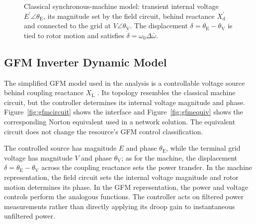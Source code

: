 \documentclass[11pt]{article}
\begin{document}
\begin{figure}[tbp]\centering

\caption{Classical synchronous-machine model: transient internal voltage $E^\prime\angle\theta_{\mathrm{E}}$, its magnitude set by the field circuit, behind reactance $X^\prime_{\mathrm{d}}$ and connected to the grid at $V\angle\theta_{\mathrm{V}}$. The displacement $\delta=\theta_{\mathrm{E}}-\theta_{\mathrm{V}}$ is tied to rotor motion and satisfies $\dot\delta=\omega_0\Delta\bar{\omega}$.}
\label{fig:smcircuit}
\end{figure}

\subsection{GFM Inverter Dynamic Model}
\label{sec:gfmmodel}
The simplified GFM model used in the analysis is a controllable voltage source behind coupling reactance $X_{\mathrm{L}}$ \cite{du2023a1}. Its topology resembles the classical machine circuit, but the controller determines its internal voltage magnitude and phase. Figure~\ref{fig:gfmcircuit} shows the interface and Figure~\ref{fig:gfmequiv} shows the corresponding Norton equivalent used in a network solution. The equivalent circuit does not change the resource's GFM control classification.

The controlled source has magnitude $E$ and phase $\theta_{\mathrm{E}}$, while the terminal grid voltage has magnitude $V$ and phase $\theta_{\mathrm{V}}$; as for the machine, the displacement $\delta=\theta_{\mathrm{E}}-\theta_{\mathrm{V}}$ across the coupling reactance sets the power transfer. In the machine representation, the field circuit sets the internal voltage magnitude and rotor motion determines its phase. In the GFM representation, the power and voltage controls perform the analogous functions. The controller acts on filtered power measurements rather than directly applying its droop gain to instantaneous unfiltered power.
\end{document}
